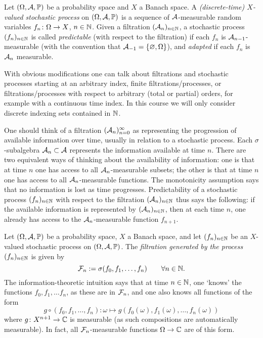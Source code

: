 \begin{defn}
  Let $(\Omega,\mathcal{A},\mathbb{P})$ be a probability space and $X$ a Banach space.
  A \emph{(discrete-time) $X$-valued stochastic process} on $(\Omega,\mathcal{A},\mathbb{P})$ is a sequence of $\mathcal{A}$-measurable random variables $f_n \colon \Omega \rightarrow X$, $n \in \mathbb{N}$.
  Given a filtration $(\mathcal{A}_n)_{n \in \mathbb{N}}$, a stochastic process $(f_n)_{n \in \mathbb{N}}$ is called \emph{predictable} (with respect to the filtration) if each $f_n$ is $\mathcal{A}_{n-1}$-measurable (with the convention that $\mathcal{A}_{-1} = \{\varnothing, \Omega\}$), and \emph{adapted} if each $f_n$ is $\mathcal{A}_{n}$ measurable.
\end{defn}

\begin{rmk}
  With obvious modifications one can talk about filtrations and stochastic processes starting at an arbitrary index, finite filtrations/processes, or filtrations/processes with respect to arbitrary (total or partial) orders, for example with a continuous time index.
  In this course we will only consider discrete indexing sets contained in $\mathbb{N}$.
\end{rmk}

One should think of a filtration $(\mathcal{A}_n)_{n=0}^\infty$ as representing the progression of available information over time, usually in relation to a stochastic process.
Each $\sigma$-subalgebra $\mathcal{A}_n \subset \mathcal{A}$ represents the information available at time $n$.
There are two equivalent ways of thinking about the availability of information: one is that at time $n$ one has access to all $\mathcal{A}_n$-measurable subsets; the other is that at time $n$ one has access to all $\mathcal{A}_n$-measurable functions.
The monotonicity assumption says that no information is lost as time progresses.
Predictability of a stochastic process $(f_n)_{n \in \mathbb{N}}$ with respect to the filtration $(\mathcal{A}_n)_{n \in \mathbb{N}}$ thus says the following: if the available information is represented by $(\mathcal{A}_n)_{n \in \mathbb{N}}$, then at each time $n$, one already has access to the $\mathcal{A}_n$-measurable function $f_{n+1}$.

\begin{example}\label{eg:filtration-generated-by-process}
  Let $(\Omega,\mathcal{A},\mathbb{P})$ be a probability space, $X$ a Banach space, and let $(f_n)_{n \in \mathbb{N}}$ be an $X$-valued stochastic process on $(\Omega,\mathcal{A},\mathbb{P})$.
  The \emph{filtration generated by the process $(f_n)_{n \in \mathbb{N}}$} is given by
  \begin{equation*}
    \mathcal{F}_n := \sigma(f_0,f_1,\ldots,f_n) \qquad \forall n \in \mathbb{N}.
  \end{equation*}
  The information-theoretic intuition says that at time $n \in \mathbb{N}$, one `knows' the functions $f_0, f_1, \ldots f_n$, as these are in $\mathcal{F}_n$, and one also knows all functions of the form
  \begin{equation*}
    g \circ (f_0, f_1, \ldots, f_n) \colon \omega \mapsto g(f_0(\omega),f_1(\omega),\ldots,f_n(\omega))
  \end{equation*}
  where $g \colon X^{n+1} \rightarrow \mathbb{C}$ is measurable (as such compositions are automatically measurable).
  In fact, all $\mathcal{F}_n$-measurable functions $\Omega \to \mathbb{C}$ are of this form.
\end{example}

